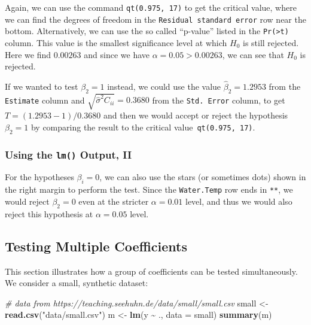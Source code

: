 \documentclass[
  a4paper,
]{article}
\newenvironment{Shaded}{\begin{snugshade}}{\end{snugshade}}
\newcommand{\AttributeTok}[1]{\textcolor[rgb]{0.13,0.29,0.53}{#1}}
\newcommand{\CommentTok}[1]{\textcolor[rgb]{0.56,0.35,0.01}{\textit{#1}}}
\newcommand{\FunctionTok}[1]{\textcolor[rgb]{0.13,0.29,0.53}{\textbf{#1}}}
\newcommand{\NormalTok}[1]{#1}
\newcommand{\OtherTok}[1]{\textcolor[rgb]{0.56,0.35,0.01}{#1}}
\newcommand{\SpecialCharTok}[1]{\textcolor[rgb]{0.81,0.36,0.00}{\textbf{#1}}}
\newcommand{\StringTok}[1]{\textcolor[rgb]{0.31,0.60,0.02}{#1}}
\theoremstyle{definition}
\theoremstyle{definition}
\theoremstyle{definition}
\theoremstyle{definition}
\theoremstyle{remark}
\begin{document}
Again, we can use the command \texttt{qt(0.975,\ 17)} to get the critical value, where
we can find the degrees of freedom in the \texttt{Residual\ standard\ error} row near
the bottom. Alternatively, we can use the so called ``p-value'' listed in the
\texttt{Pr(\textgreater{}\textbar{}t\textbar{})} column. This value is the smallest significance level at which
\(H_0\) is still rejected. Here we find \(0.00263\) and since we have
\(\alpha = 0.05 > 0.00263\), we can see that \(H_0\) is rejected.

If we wanted to test \(\beta_2 = 1\) instead, we could use the value \(\hat\beta_2
= 1.2953\) from the \texttt{Estimate} column and \(\sqrt{\hat\sigma^2 C_{ii}} = 0.3680\)
from the \texttt{Std.\ Error} column, to get \(T = (1.2953 - 1) / 0.3680\) and then we
would accept or reject the hypothesis \(\beta_2 = 1\) by comparing the result to
the critical value~\texttt{qt(0.975,\ 17)}.

\subsubsection{\texorpdfstring{Using the \texttt{lm()} Output, II}{Using the lm() Output, II}}\label{using-the-lm-output-ii}

For the hypotheses \(\beta_i = 0\), we can also use the stars (or sometimes dots)
shown in the right margin to perform the test. Since the \texttt{Water.Temp} row ends
in \texttt{**}, we would reject \(\beta_2 = 0\) even at the stricter \(\alpha=0.01\)
level, and thus we would also reject this hypothesis at \(\alpha=0.05\) level.

\subsection{Testing Multiple Coefficients}\label{testing-multiple-coefficients}

This section illustrates how a group of coefficients can be tested
simultaneously. We consider a small, synthetic dataset:

\begin{Shaded}
\begin{Highlighting}[]
\CommentTok{\# data from https://teaching.seehuhn.de/data/small/small.csv}
\NormalTok{small }\OtherTok{\textless{}{-}} \FunctionTok{read.csv}\NormalTok{(}\StringTok{"data/small.csv"}\NormalTok{)}
\NormalTok{m }\OtherTok{\textless{}{-}} \FunctionTok{lm}\NormalTok{(y }\SpecialCharTok{\textasciitilde{}}\NormalTok{ ., }\AttributeTok{data =}\NormalTok{ small)}
\FunctionTok{summary}\NormalTok{(m)}
\end{Highlighting}
\end{Shaded}
\end{document}
